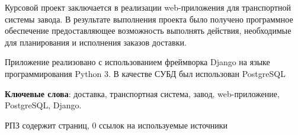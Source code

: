 Курсовой проект заключается в реализации web-приложения для транспортной системы завода. В результате выполнения проекта было получено программное обеспечение предоставляющее возможность выполнять действия, необходимые для планирования и исполнения заказов доставки.

Приложение реализовано с использованием фреймворка Django на языке программирования Python 3. В качестве СУБД был использован PostgreSQL

\textbf{Ключевые слова}: доставка, транспортная система, завод, web-приложение, PostgreSQL, Django.

РПЗ содержит \pageref{lastpage} страниц, 
0 ссылок на используемые источники
